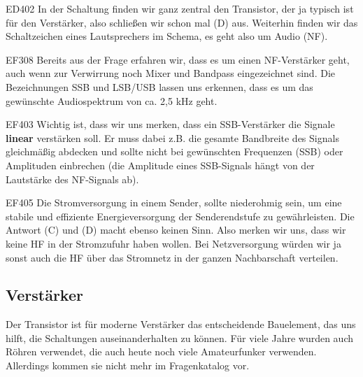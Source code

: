 \begin{sol}{ED402}
 In der Schaltung finden wir ganz zentral den Transistor, der ja typisch ist für den Verstärker, also schließen wir schon mal (D) aus. Weiterhin finden wir das Schaltzeichen eines Lautsprechers im Schema, es geht also um Audio (NF).
\end{sol}

\begin{sol}{EF308}
  Bereits aus der Frage erfahren wir, dass es um einen NF-Verstärker geht, auch wenn zur Verwirrung noch Mixer und Bandpass eingezeichnet sind. Die Bezeichnungen SSB und LSB/USB lassen uns erkennen, dass es um das gewünschte Audiospektrum von ca. 2,5 kHz geht.
\end{sol}

\begin{sol}{EF403}
 Wichtig ist, dass wir uns merken, dass ein SSB-Verstärker die Signale \textbf{linear} verstärken soll. Er muss dabei z.B. die gesamte Bandbreite des Signals gleichmäßig abdecken und sollte nicht bei gewünschten Frequenzen (SSB) oder Amplituden einbrechen (die Amplitude eines SSB-Signals hängt von der Lautstärke des NF-Signals ab).
\end{sol}

\begin{sol}{EF405}
  Die Stromversorgung in einem Sender, sollte niederohmig sein, um eine stabile und effiziente Energieversorgung der Senderendstufe zu gewährleisten. Die Antwort (C) und (D) macht ebenso keinen Sinn. Also merken wir uns, dass wir keine HF in der Stromzufuhr haben wollen. Bei Netzversorgung würden wir ja sonst auch die HF über das Stromnetz in der ganzen Nachbarschaft verteilen.
\end{sol}

\subsection{Verstärker}
\begin{ohmchapter}
Der Transistor ist für moderne Verstärker das entscheidende Bauelement, das uns hilft, die Schaltungen auseinanderhalten zu können. Für viele Jahre wurden auch Röhren verwendet, die auch heute noch viele Amateurfunker verwenden. Allerdings kommen sie nicht mehr im Fragenkatalog vor.
\end{ohmchapter}  

